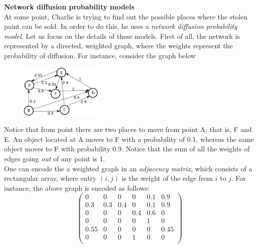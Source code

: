 \noindent\textbf{\large Network diffusion probability models} \\

At some point, Charlie is trying to find out the possible places where the stolen paint can be sold. In order to do this, he uses a \emph{network diffusion probability model}. Let us focus on the details of these models. First of all, the network is represented by a directed, weighted graph, where the weights represent the probability of diffusion. For instance, consider the graph below 
	\begin{figure}[H]
	   \centering
	   \includegraphics[width=0.35\textwidth]{season3/303/images/net_dif.png} 
	\end{figure}

Notice that from point there are two places to move from point A; that is, F and E. An object located at A moves to F with a probability of 0.1, whereas the same object moves to F with probability 0.9. Notice that the sum of all the weights of edges going \emph{out} of any point is 1. \\

One can encode the a weighted graph in an \emph{adjacency matrix}, which consists of a rectangular array, where entry $(i,j)$ is the weight of the edge from $i$ to $j$. For instance, the above graph is encoded as follows:
	\[
	\begin{pmatrix}
	0 & 0 & 0 & 0 & 0.1 & 0.9 \\
	0.3 & 0.3 & 0.4 & 0 & 0.1 & 0.9 \\
	0 & 0 & 0 & 0.4 & 0.6 & 0 \\ 
	0 & 0 & 0 & 0 & 1 & 0 \\
	0.55 & 0 & 0 & 0 & 0 & 0.45 \\
	0 & 0 & 0 & 1 & 0 & 0 \\ 
	\end{pmatrix}
	\]


